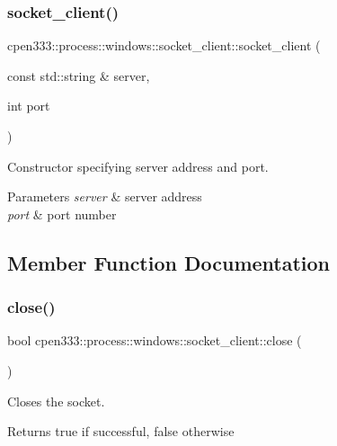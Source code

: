 \subsubsection{\texorpdfstring{socket\+\_\+client()}{socket\_client()}}
{\footnotesize\ttfamily cpen333\+::process\+::windows\+::socket\+\_\+client\+::socket\+\_\+client (\begin{DoxyParamCaption}\item[{const std\+::string \&}]{server,  }\item[{int}]{port }\end{DoxyParamCaption})\hspace{0.3cm}{\ttfamily [inline]}}



Constructor specifying server address and port. 


\begin{DoxyParams}{Parameters}
{\em server} & server address \\
\hline
{\em port} & port number \\
\hline
\end{DoxyParams}


\subsection{Member Function Documentation}
\mbox{\label{classcpen333_1_1process_1_1windows_1_1socket__client_a59c76ee5772174b920dfcd43bdf8e2ee}} 
\subsubsection{\texorpdfstring{close()}{close()}}
{\footnotesize\ttfamily bool cpen333\+::process\+::windows\+::socket\+\_\+client\+::close (\begin{DoxyParamCaption}{ }\end{DoxyParamCaption})\hspace{0.3cm}{\ttfamily [inline]}}



Closes the socket. 

\begin{DoxyReturn}{Returns}
true if successful, false otherwise 
\end{DoxyReturn}
\mbox{\label{classcpen333_1_1process_1_1windows_1_1socket__client_a8cddf32b50ea156505f17e3a69d2a0d9}} 
